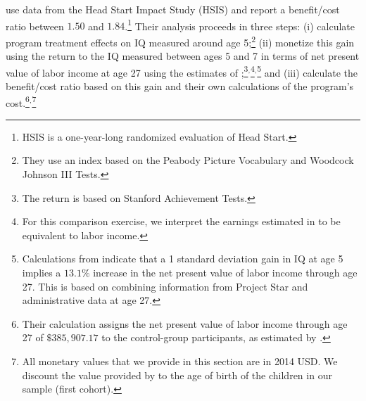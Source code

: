 \citet{Kline_Walters_2016_QJE} use data from the Head Start Impact Study (HSIS) and report a benefit/cost ratio between $1.50$ and $1.84$.\footnote{HSIS is a one-year-long randomized evaluation of Head Start.} Their analysis proceeds in three steps: (i) calculate program treatment effects on IQ measured around age 5;\footnote{They use an index based on the Peabody Picture Vocabulary and Woodcock Johnson III Tests.} (ii) monetize this gain using the return to the IQ measured between ages 5 and 7 in terms of net present value of labor income at age 27 using the estimates of \citet{Chetty_Friedman_etal_2011_QJoE};\footnote{The \citet{Chetty_Friedman_etal_2011_QJoE} return is based on Stanford Achievement Tests.}$^,$\footnote{For this comparison exercise, we interpret the earnings estimated in \citet{Chetty_Friedman_etal_2011_QJoE} to be equivalent to labor income.}$^,$\footnote{Calculations from \citet{Chetty_Friedman_etal_2011_QJoE} indicate that a 1 standard deviation gain in IQ at age 5 implies a $13.1\%$ increase in the net present value of labor income through age 27. This is based on combining information from Project Star and administrative data at age 27.} and (iii) calculate the benefit/cost ratio based on this gain and their own calculations of the program's cost.\footnote{Their calculation assigns the net present value of labor income through age 27 of $\$385,907.17$ to the control-group participants, as estimated by  \citet{Chetty_Friedman_etal_2011_QJoE}.}$^,$\footnote{All monetary values that we provide in this section are in 2014 USD. We discount the value provided by \citet{Chetty_Friedman_etal_2011_QJoE} to the age of birth of the children in our sample (first cohort).}




